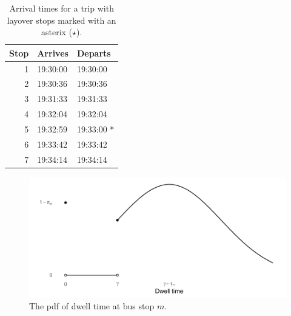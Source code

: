 \begin{knitrout}\small
{}\color{fgcolor}\begin{kframe}


{\ttfamily\noindent\itshape\color{messagecolor}{\#\# Loading required namespace: transitr}}\end{kframe}\begin{table}

\caption{\label{tab:layover_times}Arrival times for a trip with layover stops marked with an asterix ($\star$).}
\centering
\fontsize{8}{10}\selectfont
\begin{tabular}[t]{rll}
\toprule
Stop & Arrives & Departs\\
\midrule
1 & 19:30:00 & 19:30:00\\
2 & 19:30:36 & 19:30:36\\
3 & 19:31:33 & 19:31:33\\
4 & 19:32:04 & 19:32:04\\
5 & 19:32:59 & 19:33:00 *\\
6 & 19:33:42 & 19:33:42\\
7 & 19:34:14 & 19:34:14\\
\bottomrule
\end{tabular}
\end{table}


\end{knitrout}


\begin{knitrout}\small
{}\color{fgcolor}\begin{figure}

{\centering \includegraphics[width=.8\textwidth]{figure/eta_dwell_times-1} 

}

\caption[The \gls{pdf} of dwell time at bus stop $m$]{The \gls{pdf} of dwell time at bus stop $m$.}\label{fig:eta_dwell_times}
\end{figure}


\end{knitrout}



